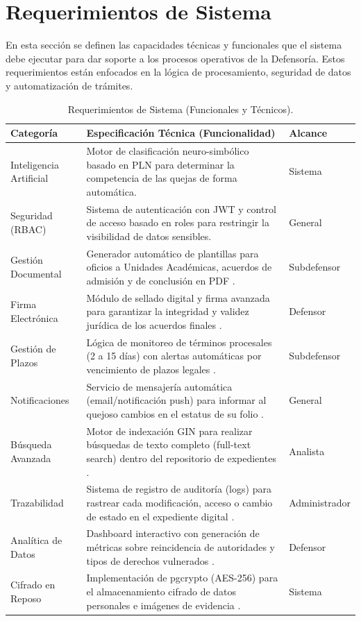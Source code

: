 \section{Requerimientos de Sistema}

En esta sección se definen las capacidades técnicas y funcionales que el sistema debe ejecutar para dar soporte a los procesos operativos de la Defensoría. Estos requerimientos están enfocados en la lógica de procesamiento, seguridad de datos y automatización de trámites.

\begin{table}[h!]
\centering
\caption{Requerimientos de Sistema (Funcionales y Técnicos).}
\label{tab:sys_req_explicito}
\begin{tabular}{@{} l p{9cm} l @{}}
\toprule
\rowcolor[HTML]{2D3E50} 
\textbf{\color[HTML]{FFFFFF} Categoría} & \textbf{\color[HTML]{FFFFFF} Especificación Técnica (Funcionalidad)} & \textbf{\color[HTML]{FFFFFF} Alcance} \\ \midrule

\rowcolor[HTML]{F2F4F7} 
Inteligencia Artificial & Motor de clasificación neuro-simbólico basado en PLN para determinar la competencia de las quejas de forma automática. & Sistema \\
Seguridad (RBAC) & Sistema de autenticación con JWT y control de acceso basado en roles para restringir la visibilidad de datos sensibles. & General \\
\rowcolor[HTML]{F2F4F7} 
Gestión Documental & Generador automático de plantillas para oficios a Unidades Académicas, acuerdos de admisión y de conclusión en PDF . & Subdefensor \\
Firma Electrónica & Módulo de sellado digital y firma avanzada para garantizar la integridad y validez jurídica de los acuerdos finales . & Defensor \\
\rowcolor[HTML]{F2F4F7} 
Gestión de Plazos & Lógica de monitoreo de términos procesales (2 a 15 días) con alertas automáticas por vencimiento de plazos legales . & Subdefensor \\
Notificaciones & Servicio de mensajería automática (email/notificación push) para informar al quejoso cambios en el estatus de su folio . & General \\
\rowcolor[HTML]{F2F4F7} 
Búsqueda Avanzada & Motor de indexación GIN para realizar búsquedas de texto completo (full-text search) dentro del repositorio de expedientes . & Analista \\
Trazabilidad & Sistema de registro de auditoría (logs) para rastrear cada modificación, acceso o cambio de estado en el expediente digital . & Administrador \\
\rowcolor[HTML]{F2F4F7} 
Analítica de Datos & Dashboard interactivo con generación de métricas sobre reincidencia de autoridades y tipos de derechos vulnerados . & Defensor \\
Cifrado en Reposo & Implementación de pgcrypto (AES-256) para el almacenamiento cifrado de datos personales e imágenes de evidencia . & Sistema \\ \bottomrule
\end{tabular}
\end{table}